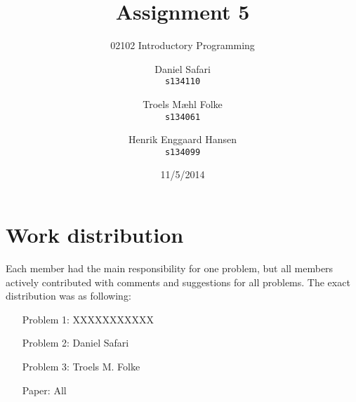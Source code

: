 \documentclass{scrartcl}
\begin{document}

\title{Assignment 5}
\subtitle{02102 Introductory Programming}
\author{
  Daniel Safari\\
  \texttt{s134110}
  \and
  Troels Mæhl Folke\\
  \texttt{s134061}
   \and
  Henrik Enggaard Hansen\\
  \texttt{s134099}
}
\date{11/5/2014}
\maketitle
\thispagestyle{empty}
\setcounter{page}{0}
\null
\vfill
\section*{Work distribution}

Each member had the main responsibility for one problem, but all members
actively contributed with comments and suggestions for all problems. 
The exact distribution was as following:
\begin{itemize}
\setlength{\itemindent}{3em}
\item[Problem 1:] XXXXXXXXXXX
\item[Problem 2:] Daniel Safari
\item[Problem 3:] Troels M. Folke
\item[Paper:]  All
\end{itemize}
\newpage






\end{document}
